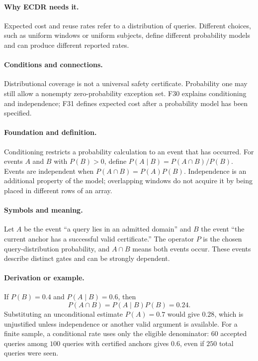 \paragraph{Why ECDR needs it.}
Expected cost and reuse rates refer to a distribution of queries.
Different choices, such as uniform windows or uniform subjects, define
different probability models and can produce different reported rates.
\paragraph{Conditions and connections.}
Distributional coverage is not a universal safety certificate.
Probability one may still allow a nonempty zero-probability exception
set. F30 explains conditioning and independence; F31 defines expected
cost after a probability model has been specified.

\paragraph{Foundation and definition.}
Conditioning restricts a probability calculation to an event that has
occurred. For events $A$ and $B$ with $P(B)>0$, define
$P(A\mid B)=P(A\cap B)/P(B)$. Events are independent when
$P(A\cap B)=P(A)P(B)$. Independence is an additional property of
the model; overlapping windows do not acquire it by being placed in
different rows of an array.
\paragraph{Symbols and meaning.}
Let $A$ be the event ``a query lies in an admitted domain'' and $B$ the
event ``the current anchor has a successful valid certificate.''
The operator $P$ is the chosen query-distribution probability, and
$A\cap B$ means both events occur. These events describe distinct
gates and can be strongly dependent.
\paragraph{Derivation or example.}
If $P(B)=0.4$ and $P(A\mid B)=0.6$, then
\[
 P(A\cap B)=P(A\mid B)P(B)=0.24.
\]
Substituting an unconditional estimate $P(A)=0.7$ would give $0.28$,
which is unjustified unless independence or another valid argument is
available. For a finite sample, a conditional rate uses only the
eligible denominator: $60$ accepted queries among $100$ queries with
certified anchors gives $0.6$, even if $250$ total queries were seen.
